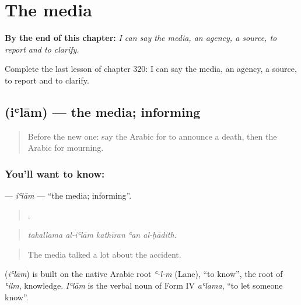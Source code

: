 
\chapter{The media}
\label{ch:ar-the-media}

\begin{chapteropening}
\textbf{By the end of this chapter:} \emph{I can say the media, an agency, a source, to report and to clarify.}

Complete the last lesson of chapter 320: I can say the media, an agency, a source, to report and to clarify.
\end{chapteropening}

\section[\texorpdfstring{\ar{إعلام} (iʿlām)}{إعلام (iʿlām)}]{ (iʿlām) — the media; informing}

\label{lesson:AR-C320-ilam}



\begin{quote}
Before the new one: say the Arabic for to announce a death, then the Arabic for mourning.
\end{quote}

\subsection*{You'll want to know: }
\textbf{} — \emph{iʿlām} — \textquotedblleft{}the media; informing\textquotedblright{}.

\begin{quote}
    .
\end{quote}

\begin{quote}
\emph{takallama al-iʿlām kathīran ʿan al-ḥādith.}
\end{quote}

\begin{quote}
The media talked a lot about the accident.
\end{quote}

\begin{cousinweb}
\textbf{} (\emph{iʿlām}) is built on the native Arabic root \emph{ʿ-l-m} (Lane), \textquotedblleft{}to know\textquotedblright{}, the root of \emph{ʿilm}, knowledge. \emph{Iʿlām} is the verbal noun of Form IV \emph{aʿlama}, \textquotedblleft{}to let someone know\textquotedblright{}.
\end{cousinweb}

